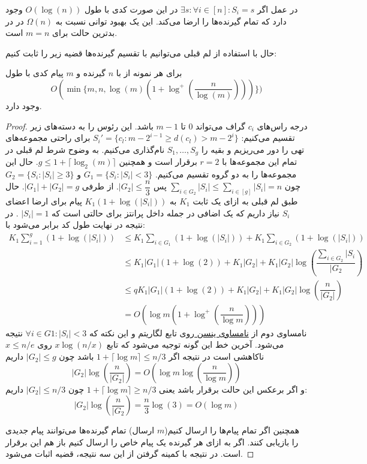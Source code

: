\begin{remark}
	در عمل اگر 
	$\exists s: \forall i \in [n]: S_i = s$
	در این صورت کدی با طول
	$O(\log(n))$
	وجود دارد که تمام گیرنده‌ها را ارضا می‌کند. این یک بهبود توانی نسبت به
	$\Omega(n)$
	در
	\icod
	در بدترین حالت برای
	$m = n$
	است.
\end{remark}

حال با استفاده از لم قبلی می‌توانیم با تقسیم گیرنده‌ها قضیه زیر را ثابت کنیم:
\begin{theorem}
	\label{theorem:log1}
	برای هر نمونه از
	با
	$n$
	گیرنده و 
	$m$
	پیام کدی با طول
	$$O(\min\{m, n, \log(m)(1 + \log^{+}(\dfrac{n}{\log(m)}) ))\})$$
	وجود دارد.
\end{theorem}
\begin{proof}
	درجه راس‌های 
	$c_i$
	گراف می‌تواند
	$0$
	تا
	$m - 1$
	باشد. این رئوس را به دسته‌های زیر تقسیم می‌کنیم:
	$S_{i}' = \{c_l: m - 2^{i - 1} \geq d(c_l) > m -  2^i\}$
	برای راحتی مجموعه‌های تهی را دور می‌ریزیم و بقیه را
	$S_1, \ldots, S_g$
	نام‌گذاری می‌کنیم. به وضوح شرط لم قبلی در تمام این مجموعه‌ها با
	$r = 2$
	برقرار است و همچنین
	$g \leq 1 + \lceil\log_2(m)\rceil$.
 حال این مجموعه‌ها را به دو گروه تقسیم می‌کنیم.
	$G_1 = \{ S_i: |S_i| < 3\}$
	و 
	$G_2 = \{ S_i: |S_i| \geq 3\}$
	چون
	$\sum_{i \in G_2} |S_i| \leq \sum_{i \in [g]} |S_i| = n$
	پس
	$|G_2| \leq \dfrac{n}{3}$.
 از طرفی
	$|G_1| + |G_2| = g$.
 حال طبق لم قبلی به ازای یک ثابت
	$K_1$
	به
	$K_1(1 + \log(|S_i|))$
	پیام برای ارضا اعضای
	$S_i$
	نیاز داریم که یک اضافی در جمله داخل پرانتز برای حالتی است که
	$|S_i| = 1$
	. در نتیجه در نهایت طول کد برابر می‌شود با:
	\begin{align}
		K_1 \sum\limits_{i = 1}^{g} (1 + \log(|S_i|)) 
		& \leq K_1 \sum_{i \in G_1}	(1 + \log(|S_i|)) + K_1 \sum_{i \in G_2} (1 + \log(|S_i|)) \\
		& \leq K_1 |G_1| (1 + \log(2)) + K_1 |G_2| + K_1 |G_2| \log(\dfrac{\sum_{i\in G_2} |S_i}{|G_2}) \\
		& \leq q K_1 |G_1| (1 + \log(2)) + K_1 |G_2| + K_1 |G_2| \log(\dfrac{n}{|G_2|}) \\
		& = O(\log m (1 + \log^{+}(\dfrac{n}{\log m})))
	\end{align}
	نامساوی دوم از 
	\hyperref[Jensen]{
		نامساوی ینسن
	}
	روی تابع لگاریتم و این نکته که
	$\forall i \in G1: |S_i| < 3$
	نتیجه می‌شود. آخرین خط این گونه توجیه می‌شود که تابع
	$x \log(n/x)$
	روی
	$x \leq n/e$
	ناکاهشی است در نتیجه اگر
	$1 + \lceil \log m \rceil \leq n/3$
	باشد چون
	$|G_2| \leq g$
	داریم
	$$|G_2| \log (\dfrac{n}{|G_2|}) = O(\log m \log (\dfrac{n}{\log m}))$$
	و اگر برعکس این حالت برقرار باشد یعنی
	$1 + \lceil \log m \rceil \ge n/3$
	چون 
	$|G_2| \leq n/3$
	داریم:
	$$|G_2| \log(\dfrac{n}{|G_2}) = \dfrac{n}{3} \log(3) = O(\log m)$$
	
	همچنین اگر تمام پیام‌ها را ارسال کنیم($m$
	ارسال) تمام گیرنده‌ها می‌توانند پیام جدیدی را بازیابی کنند. اگر به ازای هر گیرنده یک پیام خاص را ارسال کنیم باز هم این برقرار است. در نتیجه با کمینه گرفتن از این سه نتیجه، قضیه اثبات می‌شود.
\end{proof}
